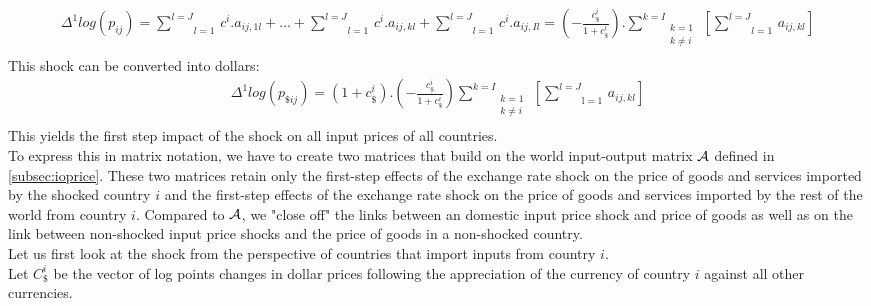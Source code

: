 \documentclass[11pt,a4paper]{article}
\begin{document}
\begin{eqnarray*}
\Delta^1log(p_{ij})=\underset{l=1}{\overset{l=J}{\mathop \sum}}\,c^i.a_{ij,1l}+\ldots +\underset{l=1}{\overset{{l}=J}{\mathop \sum }}\,c^i.a_{ij,kl}+\underset{l=1}{\overset{l={J}}{\mathop \sum }}\,c^i.{{a}_{ij,Il}}=\left( -\frac{c_\$^i}{1+c_\$^i}\right).\underset{\begin{matrix}k=1\\k\neq i\\\end{matrix}}{\overset{k=I}{\mathop\sum}}\,\left[\underset{l=1}{\overset{l=J}{\mathop\sum}}\,a_{ij,kl}\right] 
\end{eqnarray*}
This shock can be converted into dollars: \\
\begin{eqnarray}
\Delta^1 log(p_{\$ij})=\left(1+c_\$^i\right).\left(-\frac{c_\$^i}{1+c_\$^i}\right)\underset{\begin{matrix}k=1\\k\neq i\\\end{matrix}}{\overset{{k}={I}}{\mathop\sum}}\,\left[\underset{\text{l}=1}{\overset{{l}={J}}{\mathop\sum}}\,{{{a}}_{ij,kl}}\right] 
\label{eq:eq2}
\end{eqnarray}
This yields the first step impact of the shock on all input prices of all countries.\\
To express this in matrix notation, we have to create two matrices that build on the world input-output matrix $\cal A$ defined in \ref{subsec:ioprice}. 
These two matrices retain only the first-step effects of the exchange rate shock on the price of goods and services imported by the shocked country $i$ and the first-step effects of the exchange rate shock on the price of goods and services imported by the rest of the world from country $i$. 
Compared to $\cal A$, we "close off" the links between an domestic input price shock and price of goods as well as on the link between non-shocked input price shocks and the price of goods in a non-shocked country.\\
Let us first look at the shock from the perspective of countries that import inputs from country $i$.\\
Let $C_\$^i$ be the vector of log points changes in dollar prices following the 
appreciation of the currency of country $i$ against all other currencies.
\end{document}
